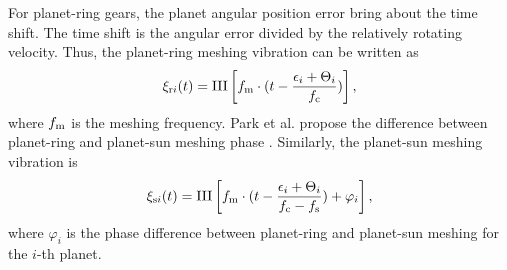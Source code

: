 \documentclass[a4paper]{cas-sc}%
\begin{document}
\par For planet-ring gears, the planet angular position error bring about the time shift. The time shift is the angular error divided by the relatively rotating velocity. Thus, the planet-ring meshing vibration can be written as
\begin{equation}
    \xi_{{\rm r}i}(t)=\operatorname{III}\left[f_{\rm m} \cdot (t-\frac{\epsilon_i+\Theta_i}{f_{\rm c}})\right],\label{eq:planet-ring_meshing}
\end{equation}
where $f_{\rm m}$ is the meshing frequency. Park et al. propose the difference between planet-ring and planet-sun meshing phase \cite{Parker2004}. Similarly, the planet-sun meshing vibration is
\begin{equation}
    \xi_{{\rm s}i}(t)=\operatorname{III}\left[f_{\rm m} \cdot (t - \frac{\epsilon_i+\Theta_i}{f_{\rm c}-f_{\rm s}})+\varphi_i\right],\label{eq:planet-sun_meshing}
\end{equation}
where $\varphi_i$ is the phase difference between planet-ring and planet-sun meshing for the $i$-th planet.
\end{document}
